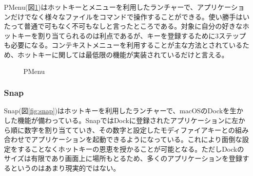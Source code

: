 PMenu(図\ref{fig:pmenu})はホットキーとメニューを利用したランチャーで、アプリケーションだけでなく様々なファイルをコマンドで操作することができる。使い勝手はいたって普通で可もなく不可もなしと言ったところである。対象に自分の好きなホットキーを割り当てられるのは利点であるが、キーを登録するために3ステップも必要になる。コンテキストメニューを利用することが主な方法とされているため、ホットキーに関しては最低限の機能が実装されているだけと言える。

\begin{figure}[h]
    \begin{center}
    \end{center}
    \caption{PMenu}
    \label{fig:pmenu}
\end{figure}

\subsubsection{Snap}

Snap(図\ref{fig:snap})はホットキーを利用したランチャーで、macOSのDockを生かした機能が備わっている。SnapではDockに登録されたアプリケーションに左から順に数字を割り当てていき、その数字と設定したモディファイアキーとの組み合わせでアプリケーションを起動できるようになっている。これにより面倒な設定をすることなくホットキーの恩恵を授かることが可能となる。ただしDockのサイズは有限であり画面上に場所もとるため、多くのアプリケーションを登録するというのはあまり現実的ではない。


